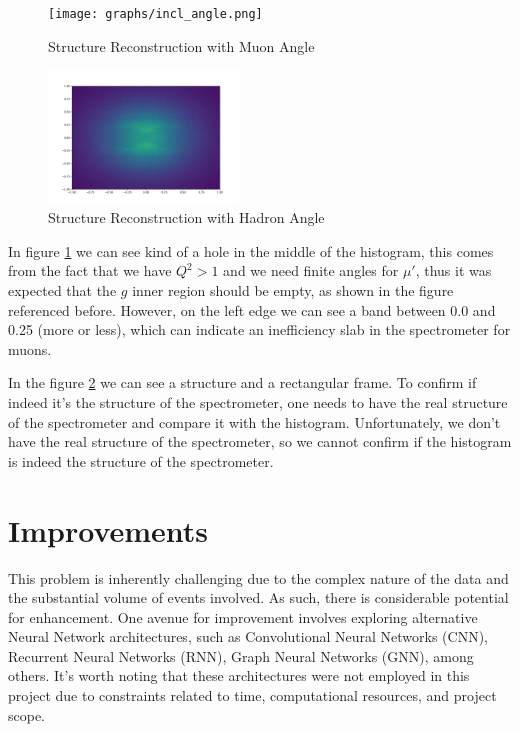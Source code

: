 \documentclass[EPJ,twocolumn]{webofc}
\begin{document}
    \begin{figure}[H]
        \texttt{[image: graphs/incl\_angle.png]}
        \caption{Structure Reconstruction with Muon Angle}
        \label{fig:muon_angle}
    \end{figure}
    
    \begin{figure}[H]
        \includegraphics[width=0.45\textwidth]{graphs/hadron_angle.png}
        \caption{Structure Reconstruction with Hadron Angle}
        \label{fig:hadron_angle}
    \end{figure}


In figure \ref{fig:muon_angle} we can see kind of a hole in the middle of the histogram, this comes from the fact
that we have $Q^2 > 1$ and we need finite angles for $\mu'$, thus it was expected that the $g$ inner region
should be empty, as shown in the figure referenced before. However, on the left edge we can see a band
between 0.0 and 0.25 (more or less), which can indicate an inefficiency slab in the spectrometer for muons.

In the figure \ref{fig:hadron_angle} we can see a structure and a rectangular frame. To confirm if indeed it's
the structure of the spectrometer, one needs to have the real structure of the spectrometer and compare it with the histogram.
Unfortunately, we don't have the real structure of the spectrometer, so we cannot confirm if the histogram is indeed the structure of the spectrometer.


\section{Improvements}
This problem is inherently challenging due to the complex nature of the data and the substantial volume of events involved.
As such, there is considerable potential for enhancement. One avenue for improvement involves exploring alternative Neural
Network architectures, such as Convolutional Neural Networks (CNN), Recurrent Neural Networks (RNN), Graph Neural Networks (GNN),
among others. It's worth noting that these architectures were not employed in this project due to constraints related to time,
computational resources, and project scope.
\end{document}
